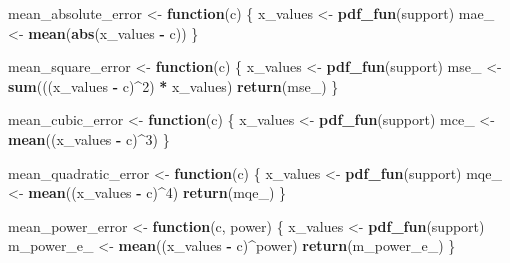 \documentclass[
]{book}
\newenvironment{Shaded}{\begin{snugshade}}{\end{snugshade}}
\newcommand{\ControlFlowTok}[1]{\textcolor[rgb]{0.13,0.29,0.53}{\textbf{#1}}}
\newcommand{\DecValTok}[1]{\textcolor[rgb]{0.00,0.00,0.81}{#1}}
\newcommand{\FunctionTok}[1]{\textcolor[rgb]{0.13,0.29,0.53}{\textbf{#1}}}
\newcommand{\NormalTok}[1]{#1}
\newcommand{\OtherTok}[1]{\textcolor[rgb]{0.56,0.35,0.01}{#1}}
\newcommand{\SpecialCharTok}[1]{\textcolor[rgb]{0.81,0.36,0.00}{\textbf{#1}}}
\theoremstyle{definition}
\theoremstyle{definition}
\theoremstyle{definition}
\theoremstyle{definition}
\theoremstyle{remark}
\begin{document}
\begin{Shaded}
\begin{Highlighting}[]
\NormalTok{mean\_absolute\_error }\OtherTok{\textless{}{-}} \ControlFlowTok{function}\NormalTok{(c) \{ }
\NormalTok{  x\_values }\OtherTok{\textless{}{-}} \FunctionTok{pdf\_fun}\NormalTok{(support)}
\NormalTok{  mae\_     }\OtherTok{\textless{}{-}} \FunctionTok{mean}\NormalTok{(}\FunctionTok{abs}\NormalTok{(x\_values }\SpecialCharTok{{-}}\NormalTok{ c))}
\NormalTok{\}}

\NormalTok{mean\_square\_error }\OtherTok{\textless{}{-}} \ControlFlowTok{function}\NormalTok{(c) \{ }
\NormalTok{  x\_values }\OtherTok{\textless{}{-}} \FunctionTok{pdf\_fun}\NormalTok{(support)}
\NormalTok{  mse\_     }\OtherTok{\textless{}{-}} \FunctionTok{sum}\NormalTok{(((x\_values }\SpecialCharTok{{-}}\NormalTok{ c)}\SpecialCharTok{\^{}}\DecValTok{2}\NormalTok{) }\SpecialCharTok{*}\NormalTok{ x\_values)}
  \FunctionTok{return}\NormalTok{(mse\_)}
\NormalTok{\}}

\NormalTok{mean\_cubic\_error }\OtherTok{\textless{}{-}} \ControlFlowTok{function}\NormalTok{(c) \{ }
\NormalTok{  x\_values }\OtherTok{\textless{}{-}} \FunctionTok{pdf\_fun}\NormalTok{(support) }
\NormalTok{  mce\_     }\OtherTok{\textless{}{-}} \FunctionTok{mean}\NormalTok{((x\_values }\SpecialCharTok{{-}}\NormalTok{ c)}\SpecialCharTok{\^{}}\DecValTok{3}\NormalTok{)}
\NormalTok{\}}

\NormalTok{mean\_quadratic\_error }\OtherTok{\textless{}{-}} \ControlFlowTok{function}\NormalTok{(c) \{ }
\NormalTok{  x\_values }\OtherTok{\textless{}{-}} \FunctionTok{pdf\_fun}\NormalTok{(support)}
\NormalTok{  mqe\_     }\OtherTok{\textless{}{-}} \FunctionTok{mean}\NormalTok{((x\_values }\SpecialCharTok{{-}}\NormalTok{ c)}\SpecialCharTok{\^{}}\DecValTok{4}\NormalTok{)}
  \FunctionTok{return}\NormalTok{(mqe\_)}
\NormalTok{\}}

\NormalTok{mean\_power\_error }\OtherTok{\textless{}{-}} \ControlFlowTok{function}\NormalTok{(c, power) \{ }
\NormalTok{  x\_values }\OtherTok{\textless{}{-}} \FunctionTok{pdf\_fun}\NormalTok{(support)}
\NormalTok{  m\_power\_e\_     }\OtherTok{\textless{}{-}} \FunctionTok{mean}\NormalTok{((x\_values }\SpecialCharTok{{-}}\NormalTok{ c)}\SpecialCharTok{\^{}}\NormalTok{power)}
  \FunctionTok{return}\NormalTok{(m\_power\_e\_)}
\NormalTok{\}}
\end{Highlighting}
\end{Shaded}
\end{document}

